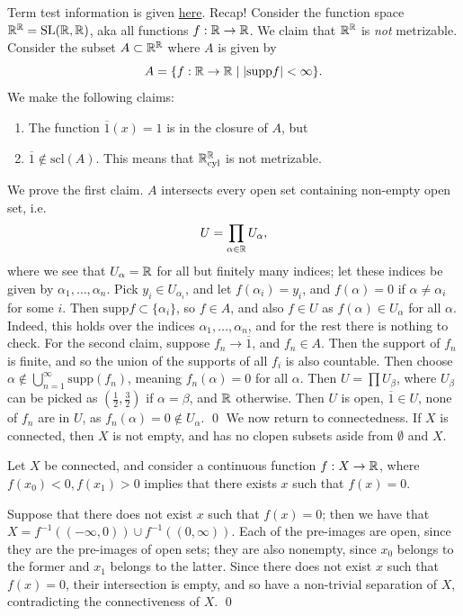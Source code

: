\noindent Term test information is given \href{https://drorbn.net/AcademicPensieve/Classes/24-327-Topology/TTInfo.pdf}{here}. Recap!
Consider the function space $\mathbb R^\mathbb R = \operatorname{SL}(\mathbb R, \mathbb R)$, aka all functions $f : \mathbb R \to \mathbb R$. We claim that $\mathbb R^\mathbb R$ is \textit{not} metrizable. Consider the subset $A \subset \mathbb R^\mathbb R$ where $A$ is given by
\[ A = \{f : \mathbb R \to \mathbb R \mid \left\lvert \mathrm{supp} f \right\rvert < \infty \}. \]
We make the following claims:
\begin{enumerate}[label=(\alph*)]
    \item The function $\overline{1}(x) = 1$ is in the closure of $A$, but
    \item $\overline{1} \not\in \mathrm{scl}(A)$. This means that $\mathbb R^\mathbb R_\mathrm{cyl}$ is not metrizable.
\end{enumerate}
We prove the first claim. $A$ intersects every open set containing non-empty open set, i.e.
\[ U = \prod_{\alpha \in \mathbb R} U_\alpha, \] 
where we see that $U_\alpha = \mathbb R$ for all but finitely many indices; let these indices be given by $\alpha_1, \dots, \alpha_n$. Pick $y_i \in U_{\alpha_i}$, and let $f(\alpha_i) = y_i$, and $f(\alpha) = 0$ if $\alpha \neq \alpha_i$ for some $i$. Then $\mathrm{supp} f \subset \{\alpha_i\}$, so $f \in A$, and also $f \in U$ as $f(\alpha) \in U_\alpha$ for all $\alpha$. Indeed, this holds over the indices $\alpha_1, \dots, \alpha_n$, and for the rest there is nothing to check.
\medskip\newline
For the second claim, suppose $f_n \to \overline{1}$, and $f_n \in A$. Then the support of $f_n$ is finite, and so the union of the supports of all $f_i$ is also countable. Then choose $\alpha \not\in \bigcup_{n=1}^{\infty} \mathrm{supp}(f_n)$, meaning $f_n(\alpha) = 0$ for all $\alpha$. Then $U = \prod U_\beta$, where $U_\beta$ can be picked as $(\frac{1}{2}, \frac{3}{2})$ if $\alpha = \beta$, and $\mathbb R$ otherwise. Then $U$ is open, $\overline{1} \in U$, none of $f_n$ are in $U$, as $f_n(\alpha) = 0 \not\in U_\alpha$. \qed
\medskip\newline
\noindent We now return to connectedness. If $X$ is connected, then $X$ is not empty, and has no clopen subsets aside from $\emptyset$ and $X$.
\begin{simplethm}
    Let $X$ be connected, and consider a continuous function $f : X \to \mathbb R$, where $f(x_0) < 0, f(x_1) > 0$ implies that there exists $x$ such that $f(x) = 0$.
\end{simplethm}
\noindent Suppose that there does not exist $x$ such that $f(x) = 0$; then we have that $X = f^{-1}((-\infty, 0)) \cup f^{-1}((0, \infty))$. Each of the pre-images are open, since they are the pre-images of open sets; they are also nonempty, since $x_0$ belongs to the former and $x_1$ belongs to the latter. Since there does not exist $x$ such that $f(x) = 0$, their intersection is empty, and so have a non-trivial separation of $X$, contradicting the connectiveness of $X$. \qed
